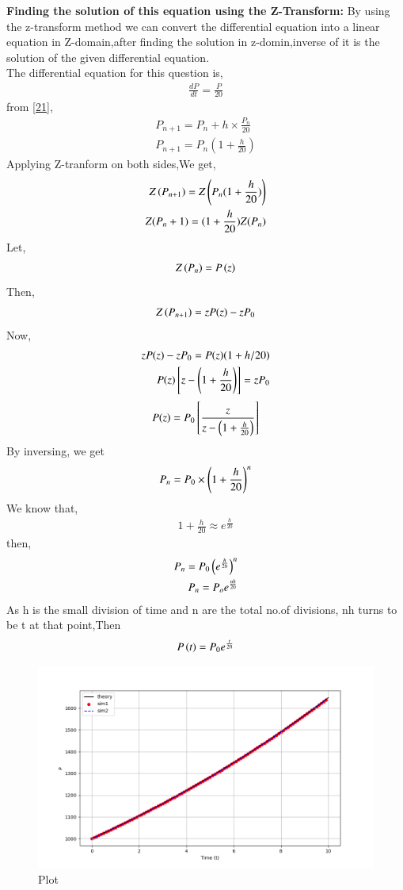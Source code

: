 \documentclass[journal]{IEEEtran}
\begin{document}
\textbf{Finding the solution of this equation using the Z-Transform:} By using the z-transform method we can convert the differential equation into a linear equation in Z-domain,after finding the solution in z-domin,inverse of it is the solution of the given differential equation. \\
The differential equation for this question is,
\begin{align}
\frac{dP}{dt}=\frac{P}{20}
\end{align}
from \eqref{21}, \\
\begin{align}
P_{n+1}=P_{n}+h \times \frac{P_n}{20} \\
P_{n+1}=P_{n}(1+\frac{h}{20})
\end{align}
Applying Z-tranform on both sides,We get,
\begin{align}
Z\left(P_{n+1}\right)=Z\left(P_{n}(1+\frac{h}{20})\right) \\
Z(P_n+1)=(1+\frac{h}{20})Z(P_n)
\end{align}
Let,
\begin{align}
Z\left(P_n\right)=P\left(z\right)
\end{align}
Then,
\begin{align}
Z\left(P_{n+1}\right)=zP(z)-zP_0
\end{align}
Now,
\begin{align}
zP(z)-zP_0 = P(z)(1+h/20) \\
P(z) {}\left[z-\left(1+\frac{h}{20}\right)\right] = zP_0 \\
\end{align}
\begin{align}
P(z) = P_0 {}\left[\frac{z}{z-\left(1+\frac{h}{20}\right)}\right]
\end{align}
By inversing, we get 
\begin{align}
P_n = P_0 \times \left(1+\frac{h}{20}\right)^n
\end{align}
We know that,
\begin{align}
1+\frac{h}{20} \approx e^{\frac{h}{20}}
\end{align}
then,
\begin{align}
P_n = P_0 \left(e^{\frac{h}{20}}\right)^n \\
P_n = P_o e^{\frac{nh}{20}}
\end{align}
As h is the small division of time and n are the total no.of divisions, nh turns to be t at that point,Then
\begin{align}
P\left(t\right)=P_0e^{\frac{t}{20}}
\end{align}



\begin{figure}[htbp] %
    \centering
    \includegraphics[width=\textwidth]{fig/plot.png} %
    \caption{Plot}
\end{figure}
\end{document}
